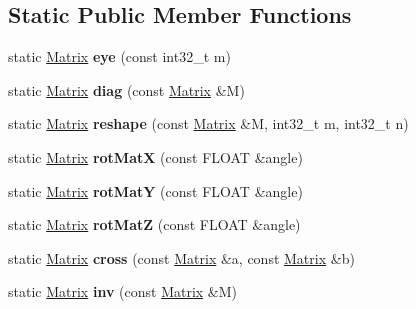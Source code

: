 \subsection*{Static Public Member Functions}
\begin{DoxyCompactItemize}
\item 
\hypertarget{class_matrix_a7cc2cf8b9be63b00b319d1ed70559b19}{static \hyperlink{class_matrix}{Matrix} {\bfseries eye} (const int32\+\_\+t m)}\label{class_matrix_a7cc2cf8b9be63b00b319d1ed70559b19}

\item 
\hypertarget{class_matrix_a2ddf6e8d19244bba0981aaf0a732c5a3}{static \hyperlink{class_matrix}{Matrix} {\bfseries diag} (const \hyperlink{class_matrix}{Matrix} \&M)}\label{class_matrix_a2ddf6e8d19244bba0981aaf0a732c5a3}

\item 
\hypertarget{class_matrix_a6b355d3979ece4e3ceee57e170751c42}{static \hyperlink{class_matrix}{Matrix} {\bfseries reshape} (const \hyperlink{class_matrix}{Matrix} \&M, int32\+\_\+t m, int32\+\_\+t n)}\label{class_matrix_a6b355d3979ece4e3ceee57e170751c42}

\item 
\hypertarget{class_matrix_a50b1b7b78b0dffe689a990114e4216f7}{static \hyperlink{class_matrix}{Matrix} {\bfseries rot\+Mat\+X} (const F\+L\+O\+A\+T \&angle)}\label{class_matrix_a50b1b7b78b0dffe689a990114e4216f7}

\item 
\hypertarget{class_matrix_aa3d80245bc5c98539445bce97ce8efaf}{static \hyperlink{class_matrix}{Matrix} {\bfseries rot\+Mat\+Y} (const F\+L\+O\+A\+T \&angle)}\label{class_matrix_aa3d80245bc5c98539445bce97ce8efaf}

\item 
\hypertarget{class_matrix_a9cdeec7ee9ce03e260556ef58110e5de}{static \hyperlink{class_matrix}{Matrix} {\bfseries rot\+Mat\+Z} (const F\+L\+O\+A\+T \&angle)}\label{class_matrix_a9cdeec7ee9ce03e260556ef58110e5de}

\item 
\hypertarget{class_matrix_ad985a2b25e9be5590c5866df56f31af2}{static \hyperlink{class_matrix}{Matrix} {\bfseries cross} (const \hyperlink{class_matrix}{Matrix} \&a, const \hyperlink{class_matrix}{Matrix} \&b)}\label{class_matrix_ad985a2b25e9be5590c5866df56f31af2}

\item 
\hypertarget{class_matrix_aa7ac64b96837c6413bd564628134a61e}{static \hyperlink{class_matrix}{Matrix} {\bfseries inv} (const \hyperlink{class_matrix}{Matrix} \&M)}\label{class_matrix_aa7ac64b96837c6413bd564628134a61e}

\end{DoxyCompactItemize}
